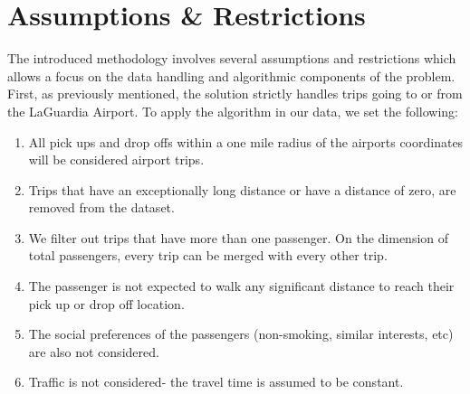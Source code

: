 \section{Assumptions \& Restrictions}
\label{sec:assumptions}
The introduced methodology involves several assumptions and restrictions which allows a focus on the data handling and algorithmic components of the problem.  First, as previously mentioned, the solution strictly handles trips going to or from the LaGuardia Airport. 
To apply the algorithm in our data, we set the following:
\begin{enumerate}
\item All pick ups and drop offs within a one mile radius of the airports coordinates will be considered airport trips.  
\item Trips that have an exceptionally long distance or have a distance of zero, are  removed from the dataset.
\item We  filter out trips that have more than one passenger.   On the dimension of total passengers, every trip can be merged with every other trip.
\item  The passenger is not expected to walk any significant distance to reach their pick up or drop off location.
\item The social preferences of the passengers (non-smoking, similar interests, etc) are also not considered.  
\item Traffic is not considered- the travel time is assumed to be constant.  
\end{enumerate}

